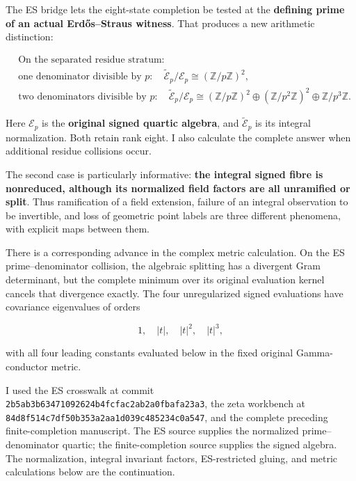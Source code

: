 The ES bridge lets the eight-state completion be tested at the
\textbf{defining prime of an actual Erdős--Straus witness}. That
produces a new arithmetic distinction:

\[
\boxed{
\begin{aligned}
&\text{On the separated residue stratum:}\\[2pt]
&\text{one denominator divisible by }p:\quad
\widetilde{\mathscr E}_p/\mathscr E_p
\cong(\mathbb Z/p\mathbb Z)^2,\\[4pt]
&\text{two denominators divisible by }p:\quad
\widetilde{\mathscr E}_p/\mathscr E_p
\cong
(\mathbb Z/p\mathbb Z)^2
\oplus(\mathbb Z/p^2\mathbb Z)^2
\oplus\mathbb Z/p^3\mathbb Z.
\end{aligned}}
\tag{1}
\]

Here \(\mathscr E_p\) is the \textbf{original signed quartic algebra},
and \(\widetilde{\mathscr E}_p\) is its integral normalization. Both
retain rank eight. I also calculate the complete answer when additional
residue collisions occur.

The second case is particularly informative: \textbf{the integral signed
fibre is nonreduced, although its normalized field factors are all
unramified or split}. Thus ramification of a field extension, failure of
an integral observation to be invertible, and loss of geometric point
labels are three different phenomena, with explicit maps between them.

There is a corresponding advance in the complex metric calculation. On
the ES prime--denominator collision, the algebraic splitting has a
divergent Gram determinant, but the complete minimum over its original
evaluation kernel cancels that divergence exactly. The four
unregularized signed evaluations have covariance eigenvalues of orders

\[
\boxed{1,\quad |t|,\quad |t|^2,\quad |t|^3,}
\tag{2}
\]

with all four leading constants evaluated below in the fixed original
Gamma-conductor metric.

I used the ES crosswalk at commit
\texttt{2b5ab3b63471092624b4fcfac2ab2a0fbafa23a3}, the zeta workbench at
\texttt{84d8f514c7df50b353a2aa1d039c485234c0a547}, and the complete
preceding finite-completion manuscript. The ES source supplies the
normalized prime--denominator quartic; the finite-completion source
supplies the signed algebra. The normalization, integral invariant
factors, ES-restricted gluing, and metric calculations below are the
continuation.

